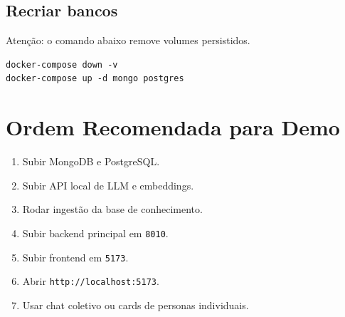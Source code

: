 \documentclass[12pt,a4paper]{article}
\begin{document}
\subsection{Recriar bancos}

Atenção: o comando abaixo remove volumes persistidos.

\begin{verbatim}
docker-compose down -v
docker-compose up -d mongo postgres
\end{verbatim}

\section{Ordem Recomendada para Demo}

\begin{enumerate}
  \item Subir MongoDB e PostgreSQL.
  \item Subir API local de LLM e embeddings.
  \item Rodar ingestão da base de conhecimento.
  \item Subir backend principal em \texttt{8010}.
  \item Subir frontend em \texttt{5173}.
  \item Abrir \texttt{http://localhost:5173}.
  \item Usar chat coletivo ou cards de personas individuais.
\end{enumerate}
\end{document}
